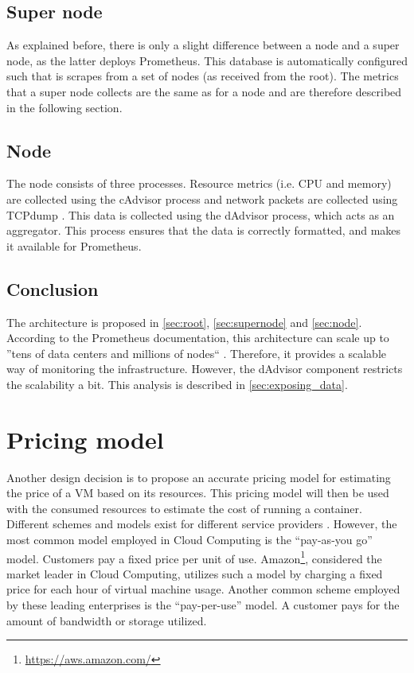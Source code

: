 \subsection{Super node} \label{sec:supernode}
As explained before, there is only a slight difference between a node and a super node, as the latter deploys Prometheus. This database is automatically configured such that is scrapes from a set of nodes (as received from the root). The metrics that a super node collects are the same as for a node and are therefore described in the following section.

\subsection{Node} \label{sec:node}
The node consists of three processes. Resource metrics (i.e. CPU and memory) are collected using the cAdvisor process and network packets are collected using TCPdump \cite{tcpdump}. This data is collected using the dAdvisor process, which acts as an aggregator. This process ensures that the data is correctly formatted, and makes it available for Prometheus.

\subsection{Conclusion}
The architecture is proposed in \autoref{sec:root}, \autoref{sec:supernode} and \autoref{sec:node}. According to the Prometheus documentation, this architecture can scale up to ''tens of data centers and millions of nodes`` \cite{prometheus_federation}. Therefore, it provides a scalable way of monitoring the infrastructure. However, the dAdvisor component restricts the scalability a bit. This analysis is described in \autoref{sec:exposing_data}.

\section{Pricing model} \label{sec:pricing}
Another design decision is to propose an accurate pricing model for estimating the price of a VM based on its resources.
This pricing model will then be used with the consumed resources to estimate the cost of running a container.
Different schemes and models exist for different service providers \cite{bulla2014cloud}. However, the most common model employed in Cloud Computing is the ``pay-as-you go'' model. Customers pay a fixed price per unit of use. Amazon\footnote{\url{https://aws.amazon.com/}}, considered the market leader in Cloud Computing, utilizes such a model by charging a fixed price for each hour of virtual machine usage. 
Another common scheme employed by these leading enterprises is the ``pay-per-use'' model. A customer pays for the amount of bandwidth or storage utilized.\\

